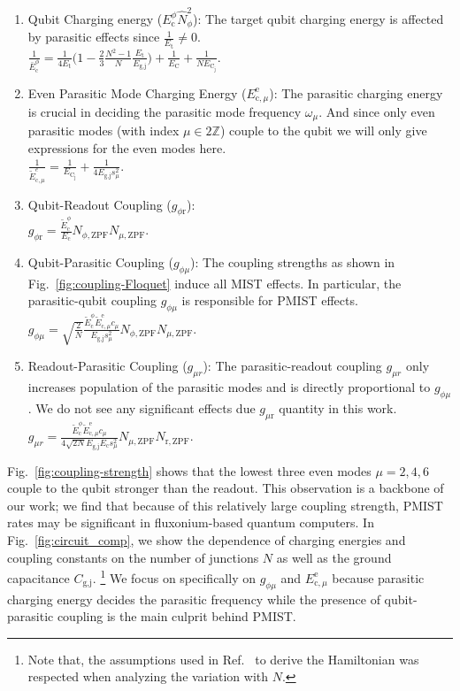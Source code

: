 \documentclass[%
reprint,
superscriptaddress,
 amsmath,amssymb,
 aps,
 prx,
longbibliography,
floatfix,
]{revtex4-2}
\begin{document}
\begin{enumerate}
\item Qubit Charging energy ($E_{\textrm{c}}^\phi \hat N_{\phi}^2$): The target qubit charging energy is affected by parasitic effects since $\frac{1}{E_\textrm{t}}\neq 0$.\\ $\frac{1}{\bar{E}_\textrm{c}^\phi}=\frac{1}{4E_{\textrm{t}}}\Big(1-\frac{2}{3}\frac{N^2-1}{N}\frac{E_{\textrm{t}}}{E_{\textrm{g,j}}}\Big)+\frac{1}{E_{\textrm{C}}}+\frac{1}{NE_{\textrm{C}_\textrm{j}}}$.
\item Even Parasitic Mode Charging Energy ($E_{\textrm{c},\mu}^\textrm{e}$): The parasitic charging energy is crucial in deciding the parasitic mode frequency $\omega_{\mu}$. And since only even parasitic modes (with index $\mu\in 2\mathbb{Z}$) couple to the qubit we will only give expressions for the even modes here.\\ $\frac{1}{\tilde{E}_{\textrm{c},\mu}^{e}}=\frac{1}{E_{\textrm{C}_\textrm{j}}}+\frac{1}{4E_{\textrm{g,j}}s_\mu^2}.$ 
\item Qubit-Readout Coupling ($g_{\phi \textrm{r}}$):\\ $g_{\phi \textrm{r}}=\frac{\tilde{E}_\textrm{c}^\phi}{E_{\textrm{c}}} N_{\phi,\mathrm{ZPF}}N_{\mu,\mathrm{ZPF}}.$
\item Qubit-Parasitic Coupling ($g_{\phi\mu}$): The coupling strengths as shown in Fig.~\ref{fig:coupling-Floquet} induce all MIST effects. In particular, the parasitic-qubit coupling $g_{\phi\mu}$ is responsible for PMIST effects.\\ $g_{\phi\mu}=\sqrt{\frac{2}{N}} \frac{\tilde{E}^\phi_\textrm{c}\tilde{E}^\textrm{e}_{\textrm{c},\mu}c_\mu}{E_{\textrm{g,j}}s_\mu^2} N_{\phi,\mathrm{ZPF}} N_{\mu,\mathrm{ZPF}}.$
\item Readout-Parasitic Coupling ($g_{\mu r}$): The parasitic-readout coupling $g_{\mu r}$ only increases population of the parasitic modes and is directly proportional to $g_{\phi\mu}$. We do not see any significant effects due $g_{\mu \textrm{r}}$ quantity in this work.\\ $g_{\mu r}=\frac{\tilde{E}^\phi_\textrm{c}\tilde{E}^\textrm{e}_{\textrm{c},\mu}c_\mu}{4\sqrt{2N}E_{\textrm{g,j}}E_{\textrm{c}}s_\mu^2} N_{\mu,\mathrm{ZPF}}N_{\textrm{r},\mathrm{ZPF}}.$   
\end{enumerate}

Fig.~\ref{fig:coupling-strength} shows that the lowest three even modes $\mu=2,4,6$ couple to the qubit stronger than the readout. This observation is a backbone of our work; we find that because of this relatively large coupling strength, PMIST rates may be significant in fluxonium-based quantum computers. In Fig.~\ref{fig:circuit_comp}, we show the dependence of charging energies and coupling constants on the number of junctions $N$ as well as the ground capacitance $C_\textrm{g,j}$. \footnote{Note that, the assumptions used in Ref.~\cite{viola2015collective} to derive the Hamiltonian was respected when analyzing the variation with $N$. } We focus on specifically on $g_{\phi\mu}$ and $E_{\textrm{c},\mu}^\textrm{e}$ because parasitic charging energy decides the parasitic frequency while the presence of qubit-parasitic coupling is the main culprit behind PMIST.
\end{document}
